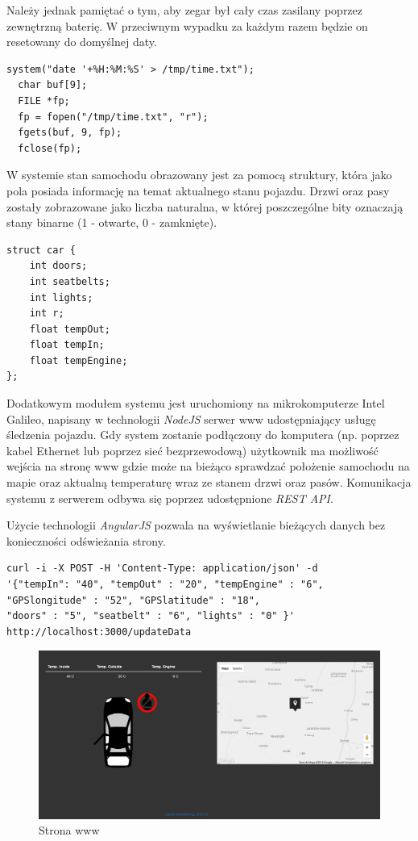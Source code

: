 \documentclass{xmgr}
\begin{document}
Należy jednak pamiętać o tym, aby zegar był cały czas zasilany poprzez zewnętrzną baterię. W przeciwnym wypadku za każdym razem będzie on resetowany do domyślnej daty.

\begin{lstlisting}[label=bot-dirs-alg,caption=Odczyt aktualnej daty]
  system("date '+%H:%M:%S' > /tmp/time.txt");
  char buf[9];
  FILE *fp;
  fp = fopen("/tmp/time.txt", "r");
  fgets(buf, 9, fp);
  fclose(fp);
\end{lstlisting}

W systemie stan samochodu obrazowany jest za pomocą struktury, która jako pola posiada informację na temat aktualnego stanu pojazdu. Drzwi oraz pasy zostały zobrazowane jako liczba naturalna, w której poszczególne bity oznaczają stany binarne (1 - otwarte, 0 - zamknięte).

\begin{lstlisting}[label=bot-dirs-alg,caption=Struktura samochodu w programie]
struct car {
	int doors;
 	int seatbelts;
 	int lights;         
 	int r;
 	float tempOut;
 	float tempIn;
 	float tempEngine;
};
\end{lstlisting}

Dodatkowym modułem systemu jest uruchomiony na mikrokomputerze Intel Galileo, napisany w technologii \emph{NodeJS} serwer www udostępniający usługę śledzenia pojazdu. Gdy system zostanie podłączony do komputera (np. poprzez kabel Ethernet lub poprzez sieć bezprzewodową) użytkownik ma możliwość wejścia na stronę www gdzie może na bieżąco sprawdzać położenie samochodu na mapie oraz aktualną temperaturę wraz ze stanem drzwi oraz pasów. Komunikacja systemu z serwerem odbywa się poprzez udostępnione \emph{REST API}. 

Użycie technologii \emph{AngularJS} pozwala na wyświetlanie bieżących danych bez konieczności odświeżania strony.

\begin{lstlisting}[label=bot-dirs-alg,caption=Request wysyłany do serwera www]
curl -i -X POST -H 'Content-Type: application/json' -d 
'{"tempIn": "40", "tempOut" : "20", "tempEngine" : "6", 
"GPSlongitude" : "52", "GPSlatitude" : "18", 
"doors" : "5", "seatbelt" : "6", "lights" : "0" }' 
http://localhost:3000/updateData
\end{lstlisting}

\begin{figure}[!h]
    \centering
    	\includegraphics[height=0.3\textheight]{images/www.png}
    \caption{Strona www}
\end{figure}
\end{document}
